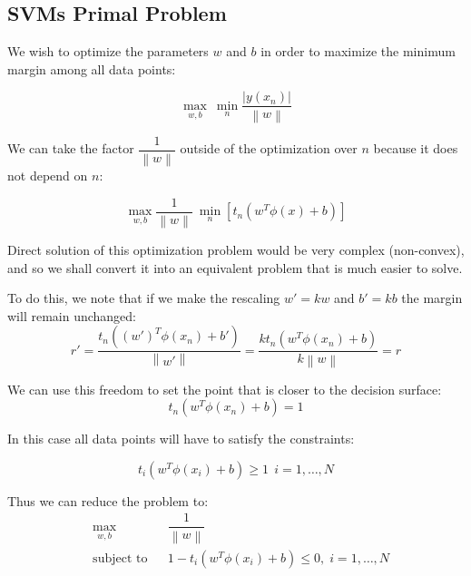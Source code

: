 \documentclass[twoside]{article}
\newcommand{\norm}[1]{\left\lVert #1 \right\rVert}
\begin{document}
\newpage

\subsection{SVMs Primal Problem}

We wish to optimize the parameters $w$ and $b$ in order to maximize the minimum margin among all data points:

\begin{equation*}
\max_{w,b} \  \min_{n}   \dfrac{\lvert y(x_{n}) \rvert}{\norm{w}} 
\end{equation*}

We can take the factor $\dfrac{1}{\norm{w}}$ outside of the optimization over $n$ because it does not depend on $n$:

\begin{equation*}
\max_{w,b} \dfrac{1}{\norm{w}} \ \min_{n}  [t_{n} (w^T \phi(x) +b) ]
\end{equation*}

Direct solution of this optimization problem would be very complex (non-convex), and so we shall convert it into an equivalent problem that is much easier to solve. 

To do this, we note that if we make the rescaling $w' = kw$ and $b' = kb$ the margin will remain unchanged: 
\begin{equation*}
    r' = \dfrac{t_{n}((w')^T \phi(x_{n}) +b')}{\norm{w'}} = \dfrac{k t_{n} (w^T \phi(x_{n}) + b)}{k \norm{w}} = r
\end{equation*}

We can use this freedom to set the point that is closer to the decision surface:
\begin{equation*}
    t_{n} (w^T \phi(x_{n}) +b) = 1
\end{equation*}

In this case all data points will have to satisfy the constraints:

\begin{equation*}
    t_{i} (w^T \phi(x_{i}) +b) \geq 1 \ \ i = 1,\dotsc,N
\end{equation*}

Thus we can reduce the problem to:
\begin{equation*}
\begin{aligned}
& \underset{w,b}{\text{max}}
& & \dfrac{1}{\norm{w}}\\
& \text{subject to}
& & 1 - t_{i} (w^T \phi(x_{i}) +b)  \leq 0, \; i = 1, \ldots, N \\
\end{aligned}
\end{equation*}
\end{document}
